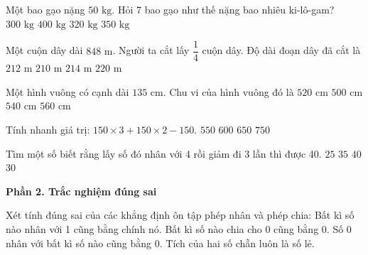 \begin{ex} %
Một bao gạo nặng $50\text{ kg}$. Hỏi 7 bao gạo như thế nặng bao nhiêu ki-lô-gam?
\choice
{$300\text{ kg}$}
{$400\text{ kg}$}
{$320\text{ kg}$}
{\True $350\text{ kg}$}
\end{ex}

\begin{ex} %
Một cuộn dây dài $848\text{ m}$. Người ta cắt lấy $\dfrac{1}{4}$ cuộn dây. Độ dài đoạn dây đã cắt là
\choice
{\True $212\text{ m}$}
{$210\text{ m}$}
{$214\text{ m}$}
{$220\text{ m}$}
\end{ex}

\begin{ex} %
Một hình vuông có cạnh dài $135\text{ cm}$. Chu vi của hình vuông đó là
\choice
{$520\text{ cm}$}
{$500\text{ cm}$}
{\True $540\text{ cm}$}
{$560\text{ cm}$}
\end{ex}

\begin{ex} %
Tính nhanh giá trị: $150 \times 3 + 150 \times 2 - 150$.
\choice
{$550$}
{\True $600$}
{$650$}
{$750$}
\end{ex}

\begin{ex} %
Tìm một số biết rằng lấy số đó nhân với 4 rồi giảm đi 3 lần thì được 40.
\choice
{$25$}
{$35$}
{$40$}
{\True $30$}
\end{ex}

\textbf{Phần 2. Trắc nghiệm đúng sai}

\begin{ex} %
Xét tính đúng sai của các khẳng định ôn tập phép nhân và phép chia:
\choiceTF
{\True Bất kì số nào nhân với 1 cũng bằng chính nó.}
{Bất kì số nào chia cho 0 cũng bằng 0.}
{\True Số 0 nhân với bất kì số nào cũng bằng 0.}
{Tích của hai số chẵn luôn là số lẻ.}
\end{ex}

